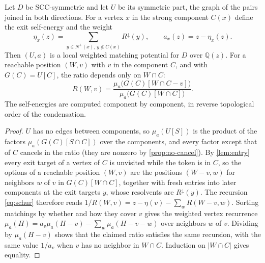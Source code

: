 \documentclass[final]{siamart0516}
\numberwithin{theorem}{section}
\numberwithin{equation}{section}
\theoremstyle{siamnonum}
\theoremstyle{plain}
\newcommand{\QQ}{\mathbb{Q}}
\newcommand{\Qz}{\QQ(z)}
\newcommand{\Rdown}{R^{\downarrow}}
\newcommand{\nplus}{N^{+}}
\begin{document}
\begin{theorem}\label{thm:directed-collapse}
Let $D$ be SCC-symmetric and let $U$ be its symmetric part, the graph of the pairs joined in both directions. For a vertex $x$ in the strong component $C(x)$ define the exit self-energy and the weight
\[
\eta_x(z)=\sum_{y\in\nplus(x),\,y\notin C(x)}\Rdown(y),\qquad a_x(z)=z-\eta_x(z).
\]
Then $(U,a)$ is a local weighted matching potential for $D$ over $\Qz$. For a reachable position $(W,v)$ with $v$ in the component $C$, and with $G(C)=U[C]$, the ratio depends only on $W\cap C$:
\[
R(W,v)=\frac{\mu_a\bigl(G(C)[W\cap C-v]\bigr)}{\mu_a\bigl(G(C)[W\cap C]\bigr)}.
\]
The self-energies are computed component by component, in reverse topological order of the condensation.
\end{theorem}

\begin{proof}
$U$ has no edges between components, so $\mu_a(U[S])$ is the product of the factors $\mu_a(G(C)[S\cap C])$ over the components, and every factor except that of $C$ cancels in the ratio (they are nonzero by \cref{prop:no-cancel}). By \cref{lem:entry} every exit target of a vertex of $C$ is unvisited while the token is in $C$, so the options of a reachable position $(W,v)$ are the positions $(W-v,w)$ for neighbors $w$ of $v$ in $G(C)[W\cap C]$, together with fresh entries into later components at the exit targets $y$, whose resolvents are $\Rdown(y)$. The recursion \eqref{eq:schur} therefore reads $1/R(W,v)=z-\eta(v)-\sum_wR(W-v,w)$. Sorting matchings by whether and how they cover $v$ gives the weighted vertex recurrence $\mu_a(H)=a_v\mu_a(H-v)-\sum_w\mu_a(H-v-w)$ over neighbors $w$ of $v$. Dividing by $\mu_a(H-v)$ shows that the claimed ratio satisfies the same recursion, with the same value $1/a_v$ when $v$ has no neighbor in $W\cap C$. Induction on $|W\cap C|$ gives equality.
\end{proof}
\end{document}
